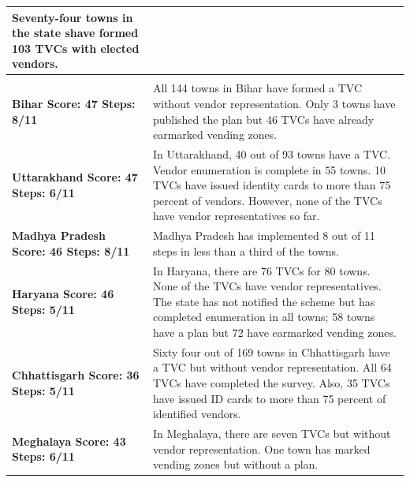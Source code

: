 \documentclass[a4paper, 12pt, twoside]{article}
\begin{document}
{\begin{longtable}[l]{>{\raggedright}p{4cm}>{\raggedright\arraybackslash}p{10cm}}
Seventy-four towns in the state shave formed 103 TVCs with elected vendors.
\\
\midrule
\multicolumn{2}{l}{States with Moderate Compliance (Index Score Between 50 to 59)}\\
\midrule
\cellcolor{SVACyellow1}\bf{Bihar}
\newline
\bf{Score: 47}
\newline
\bf{Steps: 8/11}
&
\cellcolor{SVACyellow2}All 144 towns in Bihar have formed a TVC without vendor representation. Only 3 towns have published the plan but 46 TVCs have already earmarked vending zones.
\\
\cellcolor{SVACyellow1}\bf{Uttarakhand}
\newline
\bf{Score: 47}
\newline
\bf{Steps: 6/11}
&
\cellcolor{SVACyellow2}In Uttarakhand, 40 out of 93 towns have a TVC. Vendor enumeration is complete in 55 towns. 10 TVCs have issued identity cards to more than 75 percent of vendors. However, none of the TVCs have vendor representatives so far.
\\
\cellcolor{SVACyellow1}\bf{Madhya Pradesh}
\newline
\bf{Score: 46}
\newline
\bf{Steps: 8/11}
&
\cellcolor{SVACyellow2}Madhya Pradesh has implemented 8 out of 11 steps in less than a third of the towns.
\\
\cellcolor{SVACyellow1}\bf{Haryana}
\newline
\bf{Score: 46}
\newline
\bf{Steps: 5/11}
&
\cellcolor{SVACyellow2}In Haryana, there are 76 TVCs for 80 towns. None of the TVCs have vendor representatives. The state has not notified the scheme but has completed enumeration in all towns; 58 towns have a plan but 72 have earmarked vending zones.
\\
\cellcolor{SVACyellow1}\bf{Chhattisgarh}
\newline
\bf{Score: 36}
\newline
\bf{Steps: 5/11}
&
\cellcolor{SVACyellow2}Sixty four out of 169 towns in Chhattisgarh have a TVC but without vendor representation. All 64 TVCs have completed the survey. Also, 35 TVCs have issued ID cards to more than 75 percent of identified vendors.
\\
\cellcolor{SVACyellow1}\bf{Meghalaya}
\newline
\bf{Score: 43}
\newline
\bf{Steps: 6/11}
&
\cellcolor{SVACyellow2}In Meghalaya, there are seven TVCs but without vendor representation. One town has marked vending zones but without a plan.

\end{longtable}}
\end{document}
